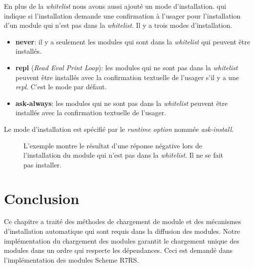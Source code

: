 En plus de la \textit{whitelist} nous avons aussi ajouté un mode
d'installation.  qui indique si l'installation demande une confirmation à
l'usager pour l'installation d'un module qui n'est pas dans la
\textit{whitelist}. Il y a trois modes d'installation.
\begin{itemize}
  \item \textbf{never}: il y a seulement les modules qui sont dans la
    \textit{whitelist} qui peuvent être installés.

  \item \textbf{repl} (\textit{Read Eval Print Loop}): les modules qui ne sont pas dans la \textit{whitelist}
    peuvent être installés avec la confirmation textuelle de l'usager s'il y a
    une \textit{repl}. C'est le mode par défaut.

  \item \textbf{ask-always}: les modules qui ne sont pas dans la \textit{whitelist}
    peuvent être installés avec la confirmation textuelle de l'usager.
\end{itemize}

Le mode d'installation est spécifié par le \textit{runtime option} nommée
\textit{ask-install}.
\begin{figure}[h]
  \caption{L'exemple montre le résultat d'une réponse négative lors de
    l'installation du module qui n'est pas dans la \textit{whitelist}.
    Il ne se fait pas installer.}
\end{figure}


\section{Conclusion}

Ce chapitre a traité des méthodes de chargement de module et des mécanismes
d'installation automatique qui sont requis dans la diffusion des modules.
Notre implémentation du chargement des modules garantit le chargement unique
des modules dans un ordre qui respecte les dépendances. Ceci est demandé dans
l'implémentation des modules Scheme R7RS.

